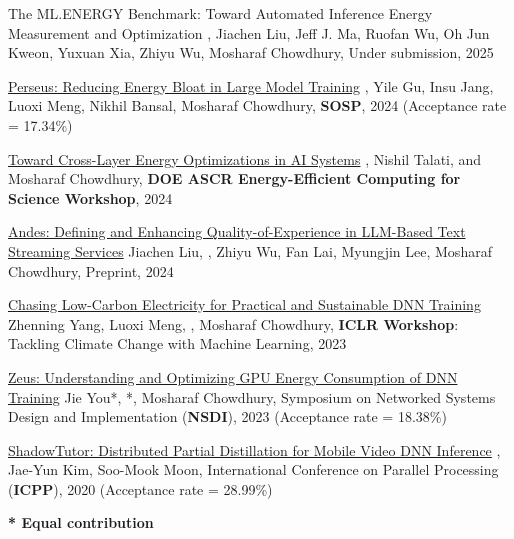 

\begin{cvlist}

  \cvlistitem
    {The ML.ENERGY Benchmark: Toward Automated Inference Energy Measurement and Optimization} %
    {, Jiachen Liu, Jeff J. Ma, Ruofan Wu, Oh Jun Kweon, Yuxuan Xia, Zhiyu Wu, Mosharaf Chowdhury, Under submission, 2025} %

  \cvlistitem
    {\href{https://arxiv.org/abs/2312.06902}{Perseus: Reducing Energy Bloat in Large Model Training}} %
    {, Yile Gu, Insu Jang, Luoxi Meng, Nikhil Bansal, Mosharaf Chowdhury, \textbf{SOSP}, 2024 (Acceptance rate = 17.34\%)} %

  \cvlistitem
    {\href{https://arxiv.org/abs/2404.06675}{Toward Cross-Layer Energy Optimizations in AI Systems}} %
    {, Nishil Talati, and Mosharaf Chowdhury, \textbf{DOE ASCR Energy-Efficient Computing for Science Workshop}, 2024} %

  \cvlistitem
    {\href{https://arxiv.org/abs/2404.16283}{Andes: Defining and Enhancing Quality-of-Experience in LLM-Based Text Streaming Services}} %
    {Jiachen Liu, , Zhiyu Wu, Fan Lai, Myungjin Lee, Mosharaf Chowdhury, Preprint, 2024} %

  \cvlistitem
    {\href{https://www.climatechange.ai/papers/iclr2023/29}{Chasing Low-Carbon Electricity for Practical and Sustainable DNN Training}} %
    {Zhenning Yang, Luoxi Meng, , Mosharaf Chowdhury, \textbf{ICLR Workshop}: Tackling Climate Change with Machine Learning, 2023} %

  \cvlistitem
    {\href{https://www.usenix.org/conference/nsdi23/presentation/you}{Zeus: Understanding and Optimizing GPU Energy Consumption of DNN Training}} %
    {Jie You*, *, Mosharaf Chowdhury, Symposium on Networked Systems Design and Implementation (\textbf{NSDI}), 2023 (Acceptance rate = 18.38\%)} %

  \cvlistitem
    {\href{https://dl.acm.org/doi/10.1145/3404397.3404404}{ShadowTutor: Distributed Partial Distillation for Mobile Video DNN Inference}} %
    {, Jae-Yun Kim, Soo-Mook Moon, International Conference on Parallel Processing (\textbf{ICPP}), 2020 (Acceptance rate = 28.99\%)} %

\end{cvlist}

\vspace{-5mm}
\begin{cvparagraph}
  \textbf{* Equal contribution}
\end{cvparagraph}
